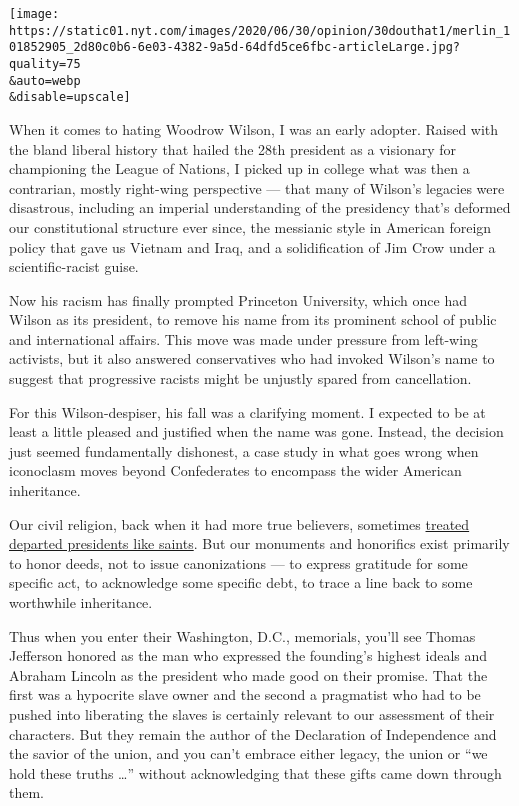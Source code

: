 \texttt{[image: https://static01.nyt.com/images/2020/06/30/opinion/30douthat1/merlin\_101852905\_2d80c0b6-6e03-4382-9a5d-64dfd5ce6fbc-articleLarge.jpg?quality=75\\\&auto=webp\\\&disable=upscale]}

When it comes to hating Woodrow Wilson, I was an early adopter. Raised
with the bland liberal history that hailed the 28th president as a
visionary for championing the League of Nations, I picked up in college
what was then a contrarian, mostly right-wing perspective --- that many
of Wilson's legacies were disastrous, including an imperial
understanding of the presidency that's deformed our constitutional
structure ever since, the messianic style in American foreign policy
that gave us Vietnam and Iraq, and a solidification of Jim Crow under a
scientific-racist guise.

Now his racism has finally prompted Princeton University, which once had
Wilson as its president, to remove his name from its prominent school of
public and international affairs. This move was made under pressure from
left-wing activists, but it also answered conservatives who had invoked
Wilson's name to suggest that progressive racists might be unjustly
spared from cancellation.

For this Wilson-despiser, his fall was a clarifying moment. I expected
to be at least a little pleased and justified when the name was gone.
Instead, the decision just seemed fundamentally dishonest, a case study
in what goes wrong when iconoclasm moves beyond Confederates to
encompass the wider American inheritance.

Our civil religion, back when it had more true believers, sometimes
\href{https://en.wikipedia.org/wiki/The_Apotheosis_of_Washington}{treated
departed presidents like saints}. But our monuments and honorifics exist
primarily to honor deeds, not to issue canonizations --- to express
gratitude for some specific act, to acknowledge some specific debt, to
trace a line back to some worthwhile inheritance.

Thus when you enter their Washington, D.C., memorials, you'll see Thomas
Jefferson honored as the man who expressed the founding's highest ideals
and Abraham Lincoln as the president who made good on their promise.
That the first was a hypocrite slave owner and the second a pragmatist
who had to be pushed into liberating the slaves is certainly relevant to
our assessment of their characters. But they remain the author of the
Declaration of Independence and the savior of the union, and you can't
embrace either legacy, the union or ``we hold these truths \ldots''
without acknowledging that these gifts came down through them.

